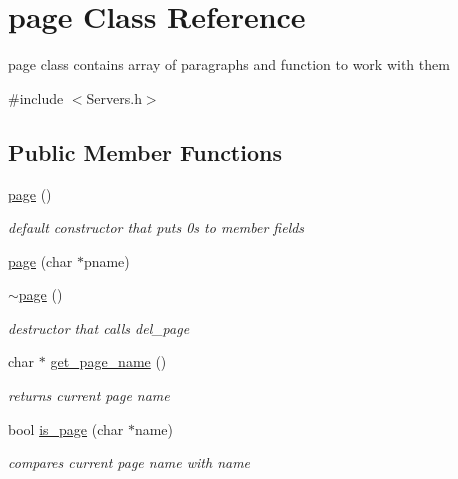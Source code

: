\hypertarget{classpage}{}\section{page Class Reference}
\label{classpage}


page class contains array of paragraphs and function to work with them  




{\ttfamily \#include $<$Servers.\+h$>$}

\subsection*{Public Member Functions}
\begin{DoxyCompactItemize}
\item 
\mbox{\label{classpage_ab0cfd233d0d3381cf9a7b83e0fddc9ee}} 
\hyperlink{classpage_ab0cfd233d0d3381cf9a7b83e0fddc9ee}{page} ()
\begin{DoxyCompactList}\small\item\em default constructor that puts 0\textquotesingle{}s to member fields \end{DoxyCompactList}\item 
\hyperlink{classpage_a70d21de949a1787fb6db224844b8dce9}{page} (char $\ast$pname)
\item 
\mbox{\label{classpage_a599995602a1df90cd29b26dd955cd93e}} 
\hyperlink{classpage_a599995602a1df90cd29b26dd955cd93e}{$\sim$page} ()
\begin{DoxyCompactList}\small\item\em destructor that calls del\+\_\+page \end{DoxyCompactList}\item 
\mbox{\label{classpage_aa54645bcbff5f2747b65a3eb4bb09b7c}} 
char $\ast$ \hyperlink{classpage_aa54645bcbff5f2747b65a3eb4bb09b7c}{get\+\_\+page\+\_\+name} ()
\begin{DoxyCompactList}\small\item\em returns current page name \end{DoxyCompactList}\item 
\mbox{\label{classpage_ad9532e48c5e2359694625de13e3825c1}} 
bool \hyperlink{classpage_ad9532e48c5e2359694625de13e3825c1}{is\+\_\+page} (char $\ast$name)
\begin{DoxyCompactList}\small\item\em compares current page name with name \end{DoxyCompactList}\item 

\end{DoxyCompactItemize}
